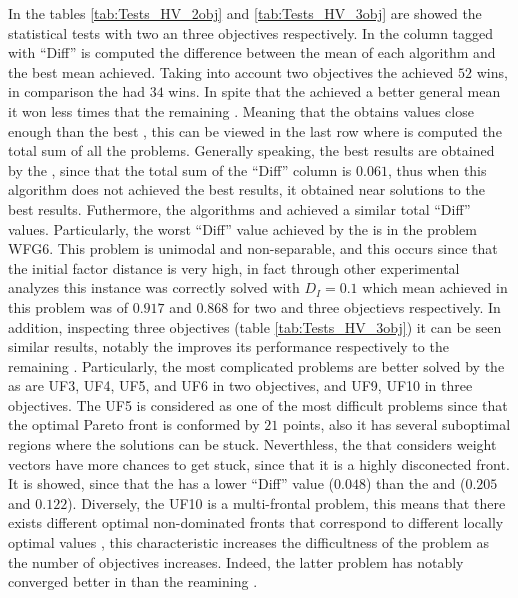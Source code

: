 In the tables \ref{tab:Tests_HV_2obj} and \ref{tab:Tests_HV_3obj} are showed the statistical tests with two an three objectives respectively.
%
In the column tagged with ``Diff'' is computed the difference between the mean of each algorithm and the best mean achieved.
%
Taking into account two objectives the \VSDMOEA{} achieved $52$ wins, in comparison the \RMOEA{} had $34$ wins.
%
In spite that the \NSGAII{} achieved a better general mean it won less times that the remaining \MOEAS{}.
%
Meaning that the \NSGAII{} obtains values close enough than the best \MOEA{}, this can be viewed in the last row where is computed the total sum of all the problems.
%
Generally speaking, the best results are obtained by the \VSDMOEA{}, since that the total sum of the ``Diff'' column is $0.061$, thus when this algorithm does not achieved the best results, it obtained near solutions to the best results.
%
Futhermore, the algorithms \RMOEA{} and \MOEAD{} achieved a similar total ``Diff'' values.
%
Particularly, the worst ``Diff'' value achieved by the \VSDMOEA{} is in the problem WFG6.
%
This problem is unimodal and non-separable, and this occurs since that the initial factor distance is very high, in fact through other experimental analyzes this instance was correctly solved with $D_I=0.1$ which mean achieved in this problem was of $0.917$ and $0.868$ for two and three objectievs respectively.
%
In addition, inspecting three objectives (table \ref{tab:Tests_HV_3obj}) it can be seen similar results, notably the \VSDMOEA{} improves its performance respectively to the remaining \MOEAS{}.
%
Particularly, the most complicated problems are better solved by the \VSDMOEA{} as are UF3, UF4, UF5, and UF6 in two objectives, and UF9, UF10 in three objectives.
%
The UF5 is considered as one of the most difficult problems since that the optimal Pareto front is conformed by $21$ points, also it has several suboptimal regions where the solutions can be stuck. 
%
Neverthless, the \MOEAS{} that considers weight vectors have more chances to get stuck, since that it is a highly disconected front.
%
It is showed, since that the \NSGAII{} has a lower ``Diff'' value ($0.048$) than the \MOEAD{} and \RMOEA{} ($0.205$ and $0.122$).
%
Diversely, the UF10 is a multi-frontal problem, this means that there exists different optimal non-dominated fronts that correspond to different locally optimal values \cite{huband2006review}, this characteristic increases the difficultness of the problem as the number of objectives increases.
%
Indeed, the latter problem has notably converged better in \VSDMOEA{} than the reamining \MOEAS{}.
%


